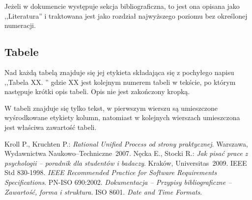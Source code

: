 \documentclass 	[11pt, a4paper, leqno]	{article}					%
\newcommand{\newoddside}{								%
	\ifthenelse{ \NOT \isodd{\thepage} } {
	    \newpage
	} {
	    \newpage
	    \newpage
	}
}
\begin{document}
Jeżeli w dokumencie występuje sekcja bibliograficzna, to jest ona opisana jako ,,Literatura'' i traktowana jest jako rozdział najwyższego poziomu bez określonej numeracji. 

\subsection{Tabele}
\noindent
Nad każdą tabelą znajduje się jej etykieta składająca się z pochyłego napisu ,,Tabela XX. '' gdzie XX jest kolejnym numerem tabeli w tekście, po którym następuje krótki opis tabeli. Opis nie jest zakończony kropką. 

W tabeli znajduje się tylko tekst, w pierwszym wierszu są umieszczone wyśrodkowane etykiety kolumn, natomiast w kolejnych wierszach umieszczona jest właściwa zawartość tabeli. 

\newoddside
{}
\begin{thebibliography}{2}
	 Kroll P., Kruchten P.: \emph{Rational Unified Process od strony praktycznej}. Warszawa, Wydawnictwa Naukowo--Techniczne~2007.
	 Nęcka E., Stocki R.: \emph{Jak pisać prace z psychologii -- poradnik dla studentów i badaczy}. Kraków, Universitas~2009.
	 IEEE Std 830-1998. \emph{IEEE Recommended Practice for Software Requirements Specifications}.
	 PN-ISO 690:2002. \emph{Dokumentacja – Przypisy bibliograficzne – Zawartość, forma i struktura}.
	 ISO 8601. \emph{Date and Time Formats}.
\end{thebibliography}
\end{document}
